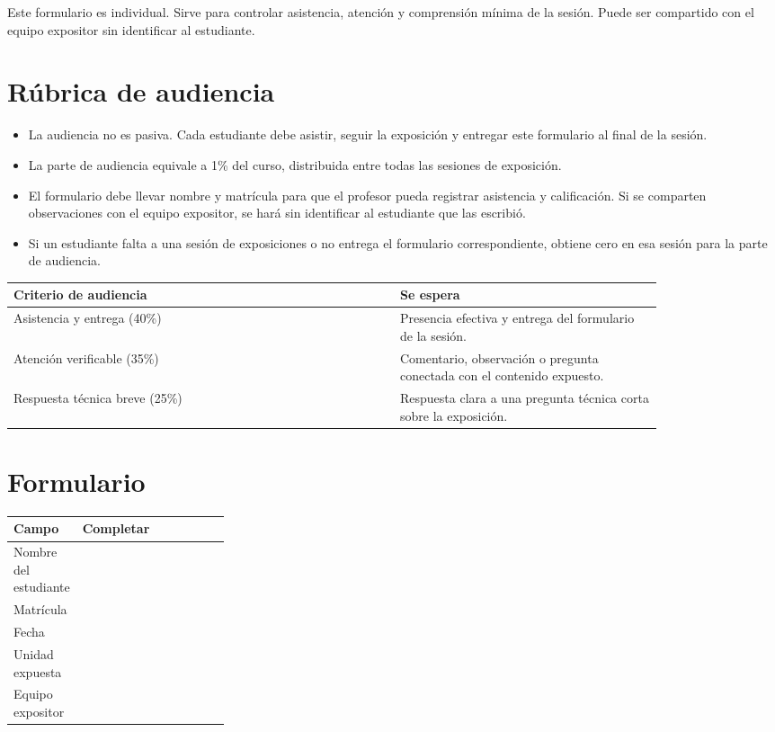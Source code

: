 \documentclass[11pt]{article}
\begin{document}

\begin{infobox}
Este formulario es individual. Sirve para controlar asistencia, atención y comprensión mínima de la sesión. Puede ser compartido con el equipo expositor sin identificar al estudiante.
\end{infobox}

\section{Rúbrica de audiencia}
\begin{itemize}
\item La audiencia no es pasiva. Cada estudiante debe asistir, seguir la exposición y entregar este formulario al final de la sesión.
\item La parte de audiencia equivale a 1\% del curso, distribuida entre todas las sesiones de exposición.
\item El formulario debe llevar nombre y matrícula para que el profesor pueda registrar asistencia y calificación. Si se comparten observaciones con el equipo expositor, se hará sin identificar al estudiante que las escribió.
\item Si un estudiante falta a una sesión de exposiciones o no entrega el formulario correspondiente, obtiene cero en esa sesión para la parte de audiencia.
\end{itemize}

\begin{center}
\begin{tabular}{p{0.50\linewidth} p{0.34\linewidth}}
\toprule
\textbf{Criterio de audiencia} & \textbf{Se espera} \\
\midrule
Asistencia y entrega (40\%) & Presencia efectiva y entrega del formulario de la sesión. \\
Atención verificable (35\%) & Comentario, observación o pregunta conectada con el contenido expuesto. \\
Respuesta técnica breve (25\%) & Respuesta clara a una pregunta técnica corta sobre la exposición. \\
\bottomrule
\end{tabular}
\end{center}

\section{Formulario}
\begin{tabularx}{\linewidth}{p{0.28\linewidth} Y}
\toprule
\textbf{Campo} & \textbf{Completar} \\
\midrule
Nombre del estudiante & \\
Matrícula & \\
Fecha & \\
Unidad expuesta & \\
Equipo expositor & \\
\bottomrule
\end{tabularx}
\end{document}
